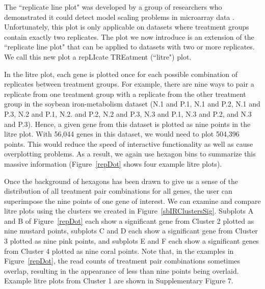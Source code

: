 \documentclass{bioinfo}
\begin{document}
The ``replicate line plot" was developed by a group of researchers who demonstrated it could detect model scaling problems in microarray data \citep{Cook}. Unfortunately, this plot is only applicable on datasets where treatment groups contain exactly two replicates. The plot we now introduce is an extension of the ``replicate line plot" that can be applied to datasets with two or more replicates. We call this new plot a repLIcate TREatment (``litre") plot.

In the litre plot, each gene is plotted once for each possible combination of replicates between treatment groups. For example, there are nine ways to pair a replicate from one treatment group with a replicate from the other treatment group in the soybean iron-metabolism dataset (N.1 and P.1, N.1 and P.2, N.1 and P.3, N.2 and P.1, N.2. and P.2, N.2 and P.3, N.3 and P.1, N.3 and P.2, and N.3 and P.3). Hence, a given gene from this dataset is plotted as nine points in the litre plot. With 56,044 genes in this dataset, we would need to plot 504,396 points. This would reduce the speed of interactive functionality as well as cause overplotting problems. As a result, we again use hexagon bins to summarize this massive information (Figure~\ref{repDot} shows four example litre plots).

Once the background of hexagons has been drawn to give us a sense of the distribution of all treatment pair combinations for all genes, the user can superimpose the nine points of one gene of interest. We can examine and compare litre plots using the clusters we created in Figure~\ref{sbIRClustersSig}. Subplots A and B of Figure~\ref{repDot} each show a significant gene from Cluster 2 plotted as nine mustard points, subplots C and D each show a significant gene from Cluster 3 plotted as nine pink points, and subplots E and F each show a significant genes from Cluster 4 plotted as nine coral points. Note that, in the examples in Figure~\ref{repDot}, the read counts of treatment pair combinations sometimes overlap, resulting in the appearance of less than nine points being overlaid. Example litre plots from Cluster 1 are shown in Supplementary Figure 7.
\end{document}
